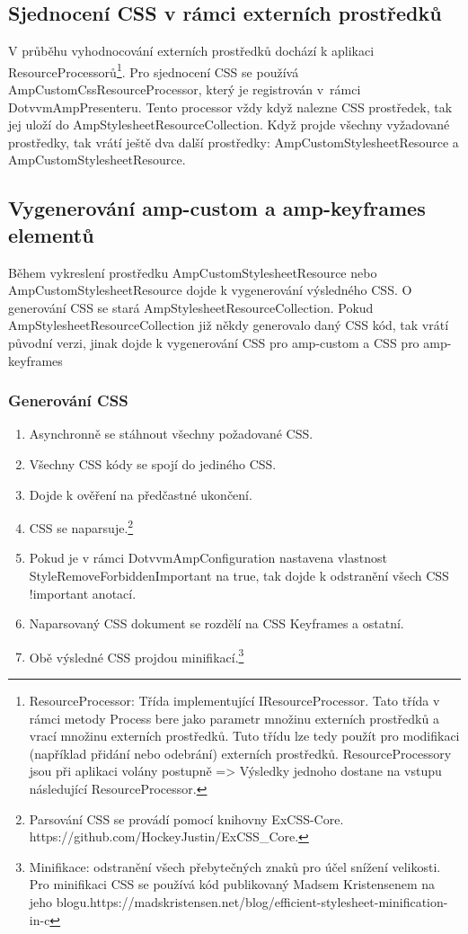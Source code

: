 \subsection*{Sjednocení CSS v rámci externích prostředků}
V průběhu vyhodnocování externích prostředků dochází k aplikaci ResourceProcessorů\footnote{ResourceProcessor: Třída implementující IResourceProcessor. Tato třída v rámci metody Process bere jako parametr množinu externích prostředků a vrací množinu externích prostředků. Tuto třídu lze tedy použít pro modifikaci (například přidání nebo odebrání) externích prostředků. ResourceProcessory jsou při aplikaci volány postupně => Výsledky jednoho dostane na vstupu následující ResourceProcessor.}. Pro sjednocení CSS se používá AmpCustomCssResourceProcessor, který je registrován v~rámci DotvvmAmpPresenteru. Tento processor vždy když nalezne CSS prostředek, tak jej uloží do AmpStylesheetResourceCollection. Když projde všechny vyžadované prostředky, tak vrátí ještě dva další prostředky: AmpCustomStylesheetResource a AmpCustomStylesheetResource.

\subsection*{Vygenerování amp-custom a amp-keyframes elementů}
Během vykreslení prostředku AmpCustomStylesheetResource nebo AmpCustomStylesheetResource dojde k vygenerování výsledného CSS. O generování CSS se stará AmpStylesheetResourceCollection. Pokud AmpStylesheetResourceCollection již někdy generovalo daný CSS kód, tak vrátí původní verzi, jinak dojde k vygenerování CSS pro amp-custom a CSS  pro amp-keyframes

\subsubsection*{Generování CSS}
\begin{enumerate}
    \item Asynchronně se stáhnout všechny požadované CSS.
    \item Všechny CSS kódy se spojí do jediného CSS.
    \item Dojde k ověření na předčastné ukončení.
    \item CSS se naparsuje.\footnote{Parsování CSS se provádí pomocí knihovny ExCSS-Core. \newline https://github.com/HockeyJustin/ExCSS_Core.}
    \item Pokud je v rámci DotvvmAmpConfiguration nastavena vlastnost StyleRemoveForbiddenImportant na true, tak dojde k odstranění všech CSS !important anotací. 
    \item Naparsovaný CSS dokument se rozdělí na CSS Keyframes a ostatní.
    \item Obě výsledné CSS projdou minifikací.\footnote{Minifikace: odstranění všech přebytečných znaků pro účel snížení velikosti. \newline Pro minifikaci CSS se používá kód publikovaný Madsem Kristensenem na jeho blogu.\newline https://madskristensen.net/blog/efficient-stylesheet-minification-in-c}
\end{enumerate}

